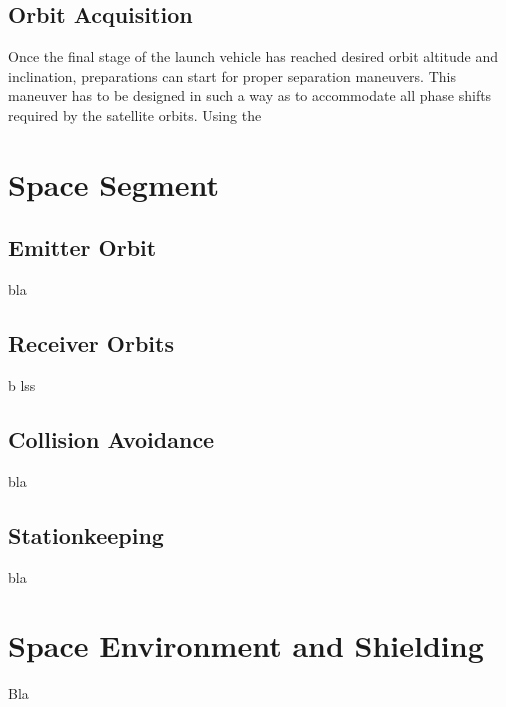 \subsection{Orbit Acquisition}
\label{frLSOI}

Once the final stage of the launch vehicle has reached desired orbit altitude and inclination, preparations can start for proper separation maneuvers. This maneuver has to be designed in such a way as to accommodate all phase shifts required by the satellite orbits. Using the 

\section{Space Segment}
\label{frSS}

\subsection{Emitter Orbit}
\label{frSSEOD}

bla

\subsection{Receiver Orbits}
\label{frSSRO}

b lss

\subsection{Collision Avoidance}
\label{frSSCA}

bla

\subsection{Stationkeeping}
\label{frSSS}

bla

\section{Space Environment and Shielding}
\label{frSEaS}

Bla